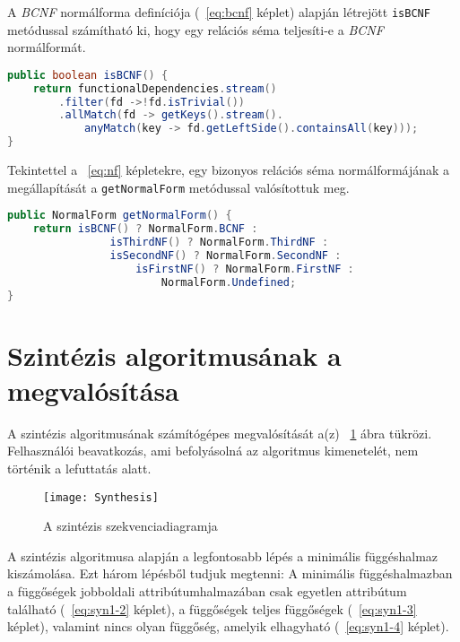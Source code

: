 A \textit{BCNF} normálforma definíciója (~\ref{eq:bcnf} képlet) alapján létrejött \lstinline{isBCNF} metódussal számítható ki, hogy egy relációs séma teljesíti-e a \textit{BCNF} normálformát.

\linespread{1}
\begin{lstlisting}[language=Java]
public boolean isBCNF() {
	return functionalDependencies.stream()
		.filter(fd ->!fd.isTrivial())
		.allMatch(fd -> getKeys().stream().
			anyMatch(key -> fd.getLeftSide().containsAll(key)));
}
\end{lstlisting}

Tekintettel a ~\ref{eq:nf} képletekre, egy bizonyos relációs séma normálformájának a megállapítását a \lstinline{getNormalForm} metódussal valósítottuk meg.

\linespread{1}
\begin{lstlisting}[language=Java]
public NormalForm getNormalForm() {
	return isBCNF() ? NormalForm.BCNF :
     			isThirdNF() ? NormalForm.ThirdNF :
				isSecondNF() ? NormalForm.SecondNF :
					isFirstNF() ? NormalForm.FirstNF : 
						NormalForm.Undefined;
}
\end{lstlisting}

\section{Szintézis algoritmusának a megvalósítása}

A szintézis algoritmusának számítógépes megvalósítását a(z) ~\ref{fig:synseq} ábra tükrözi. Felhasználói beavatkozás, ami befolyásolná az algoritmus kimenetelét, nem történik a lefuttatás alatt.

\begin{figure}
    \centering
    \texttt{[image: Synthesis]}
    \caption{A szintézis szekvenciadiagramja}
    \label{fig:synseq}
\end{figure}

A szintézis algoritmusa alapján a legfontosabb lépés a minimális függéshalmaz kiszámolása. Ezt három lépésből tudjuk megtenni: A minimális függéshalmazban a függőségek jobboldali attribútumhalmazában csak egyetlen attribútum található (~\ref{eq:syn1-2} képlet), a függőségek teljes függőségek (~\ref{eq:syn1-3} képlet), valamint nincs olyan függőség, amelyik elhagyható (~\ref{eq:syn1-4} képlet).

